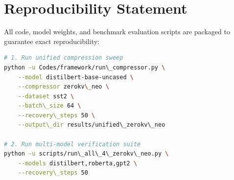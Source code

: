\section{Reproducibility Statement}
All code, model weights, and benchmark evaluation scripts are packaged to guarantee exact reproducibility:
\begin{lstlisting}[language=bash]
# 1. Run unified compression sweep
python -u Codes/framework/run\_compressor.py \
    --model distilbert-base-uncased \
    --compressor zerokv\_neo \
    --dataset sst2 \
    --batch\_size 64 \
    --recovery\_steps 50 \
    --output\_dir results/unified\_zerokv\_neo

# 2. Run multi-model verification suite
python -u scripts/run\_all\_4\_zerokv\_neo.py \
    --models distilbert,roberta,gpt2 \
    --recovery\_steps 50
\end{lstlisting}
